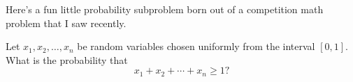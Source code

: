 Here's a fun little probability subproblem born out of a competition math
problem that I saw recently.

\begin{blackbox}
    \begin{problem}
        Let \( x_1, x_2, \ldots, x_n \) be random variables chosen uniformly
        from the interval \( \left[0, 1\right] \). What is the probability that
        \[
            x_1 + x_2 + \cdots + x_n \ge 1
        ?\]
    \end{problem}
\end{blackbox}
